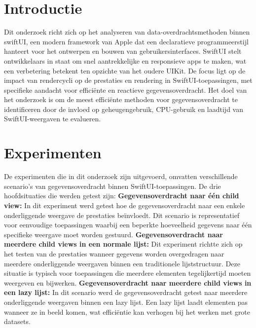 \documentclass[a0,portrait]{hogent-poster}
\begin{document}
\begin{multicols}{2} %

\section{Introductie}
Dit onderzoek richt zich op het analyseren van data-overdrachtsmethoden binnen swiftUI, een modern framework van Apple dat een declaratieve programmeerstijl hanteert voor het ontwerpen en bouwen van gebruikersinterfaces. SwiftUI stelt ontwikkelaars in staat om snel aantrekkelijke en responsieve apps te maken, wat een verbetering betekent ten opzichte van het oudere UIKit. De focus ligt op de impact van rendercycli op de prestaties en rendering in SwiftUI-toepassingen, met specifieke aandacht voor efficiënte en reactieve gegevensoverdracht. Het doel van het onderzoek is om de meest efficiënte methoden voor gegevensoverdracht te identificeren door de invloed op geheugengebruik, CPU-gebruik en laadtijd van SwiftUI-weergaven te evalueren.

\section{Experimenten}
De experimenten die in dit onderzoek zijn uitgevoerd, omvatten verschillende scenario's van gegevensoverdracht binnen SwiftUI-toepassingen. De drie hoofdsituaties die werden getest zijn:
\newline \textbf{Gegevensoverdracht naar één child view:} In dit experiment werd getest hoe de gegevensoverdracht naar een enkele onderliggende weergave de prestaties beïnvloedt. Dit scenario is representatief voor eenvoudige toepassingen waarbij een beperkte hoeveelheid gegevens naar één specifieke weergave moet worden gestuurd.
\newline \textbf{Gegevensoverdracht naar meerdere child views in een normale lijst:} Dit experiment richtte zich op het testen van de prestaties wanneer gegevens worden overgedragen naar meerdere onderliggende weergaven binnen een traditionele lijststructuur. Deze situatie is typisch voor toepassingen die meerdere elementen tegelijkertijd moeten weergeven en bijwerken.
\newline \textbf{Gegevensoverdracht naar meerdere child views in een lazy lijst:} In dit scenario werd de gegevensoverdracht getest naar meerdere onderliggende weergaven binnen een lazy lijst. Een lazy lijst laadt elementen pas wanneer ze in beeld komen, wat efficiëntie kan verhogen bij het werken met grote datasets.


\end{multicols}
\end{document}
